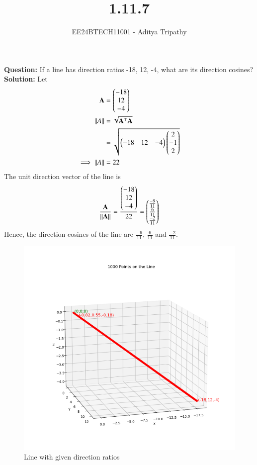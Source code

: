 \documentclass[journal]{IEEEtran}
\begin{document}

\vspace{3cm}

\title{1.11.7}
\author{EE24BTECH11001 - Aditya Tripathy
}
{\let\newpage\relax\maketitle}

\renewcommand{\thefigure}{\theenumi}
\renewcommand{\thetable}{\theenumi}
\setlength{\intextsep}{10pt} %

\textbf{Question:}
\newline
If a line has direction ratios -18, 12, -4, what are its direction cosines?\\
\textbf{Solution:}
Let 
\begin{align}
	\mathbf{A} &= \begin{pmatrix}-18\\12\\-4\end{pmatrix}\\
	\left\lVert A\right\rVert &= \sqrt{\mathbf{A}^\top\mathbf{A}}\\
		     &= \sqrt{\begin{pmatrix}-18 & 12 & -4\end{pmatrix}\begin{pmatrix}2\\-1\\2\end{pmatrix}}\\
	\implies \left\lVert A\right\rVert &= 22
\end{align}
The unit direction vector of the line is
\begin{align}
	\frac{\mathbf{A}}{\left\lVert\mathbf{A}\right\rVert} = \frac{\begin{pmatrix}-18\\12\\-4\end{pmatrix}}{22} = \begin{pmatrix}\frac{-9}{11}\\\frac{6}{11}\\\frac{-2}{11}\end{pmatrix}
\end{align}
Hence, the direction cosines of the line are $\frac{-9}{11}$, $\frac{6}{11}$ and $\frac{-2}{11}$.

\begin{figure}[h!]
   \centering
   \includegraphics[width=0.7\linewidth]{figs/fig.png}
   \caption{Line with given direction ratios}
\end{figure}
\end{document}
